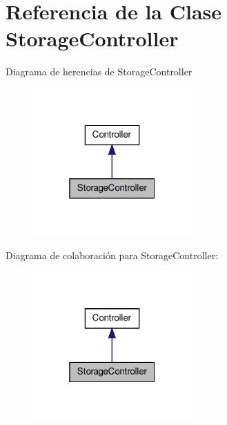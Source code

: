 \hypertarget{class_app_1_1_http_1_1_controllers_1_1_storage_controller}{\section{\-Referencia de la \-Clase \-Storage\-Controller}
\label{class_app_1_1_http_1_1_controllers_1_1_storage_controller}
}


\-Diagrama de herencias de \-Storage\-Controller
\nopagebreak
\begin{figure}[H]
\begin{center}
\leavevmode
\includegraphics[width=172pt]{class_app_1_1_http_1_1_controllers_1_1_storage_controller__inherit__graph}
\end{center}
\end{figure}


\-Diagrama de colaboración para \-Storage\-Controller\-:
\nopagebreak
\begin{figure}[H]
\begin{center}
\leavevmode
\includegraphics[width=172pt]{class_app_1_1_http_1_1_controllers_1_1_storage_controller__coll__graph}
\end{center}
\end{figure}
